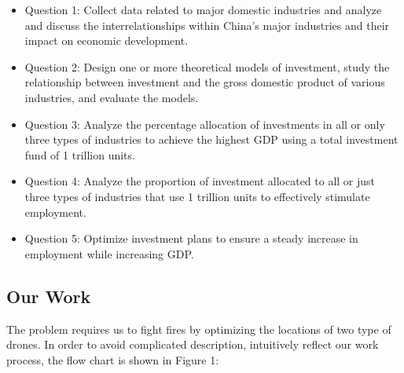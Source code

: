 \documentclass[12pt]{article}  %
\begin{document}
\begin{itemize} %
\setlength{\parsep}{0ex} %
\setlength{\topsep}{2ex} %
\setlength{\itemsep}{1ex} %
\item Question 1: Collect data related to major domestic industries and analyze and discuss the interrelationships within China's major industries and their impact on economic development.
\item Question 2: Design one or more theoretical models of investment, study the relationship between investment and the gross domestic product of various industries, and evaluate the models.
\item Question 3: Analyze the percentage allocation of investments in all or only three types of industries to achieve the highest GDP using a total investment fund of 1 trillion units.

\item Question 4: Analyze the proportion of investment allocated to all or just three types of industries that use 1 trillion units to effectively stimulate employment.
\item Question 5: Optimize investment plans to ensure a steady increase in employment while increasing GDP.
\end{itemize}


%
% 
%
%


\subsection{Our Work} %
The problem requires us to fight fires by optimizing the locations of two type of drones. In order to avoid complicated description, intuitively reflect our work process, the flow chart is shown in Figure 1:
\end{document}
